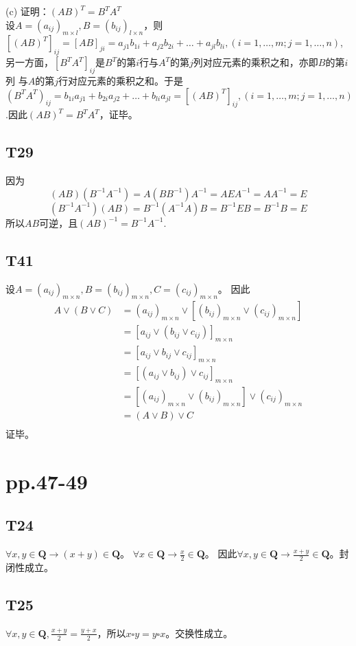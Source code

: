\documentclass{article}
\begin{document}
(c) 证明：$(AB)^T = B^TA^T$\\
设$A = (a_{ij})_{m\times l}, B = (b_{ij})_{l \times n}$，则$[(AB)^T]_{ij} = [AB]_{ji}
= a_{j1}b_{1i} + a_{j2}b_{2i} + \dots + a_{jl}b_{li},(i = 1, \dots , m; j = 1, \dots , n)$,
另一方面，$[B^TA^T]_{ij}$是$B^T$的第$i$行与$A^T$的第$j$列对应元素的乘积之和，亦即$B$的第$i$列
与$A$的第$j$行对应元素的乘积之和。于是$(B^TA^T)_{ij} = b_{1i}a_{j1} + b_{2i}a_{j2} + \dots +b_{li}a_{jl}
= [(AB)^T]_{ij}, (i = 1, \dots ,m; j = 1, \dots, n)$.因此$(AB)^T = B^TA^T$，证毕。

\subsection{T29}
因为
\[
(AB)(B^{-1}A^{-1}) = A(BB^{-1})A^{-1} = AEA^{-1} = AA^{-1} = E
\]
\[
(B^{-1}A^{-1})(AB) = B^{-1}(A^{-1}A)B = B^{-1}EB = B^{-1}B = E
\]
所以$AB$可逆，且$(AB)^{-1} = B^{-1}A^{-1}$.
\subsection{T41}
设$A = (a_{ij})_{m \times n}, B = (b_{ij})_{m \times n}, C = (c_{ij})_{m \times n}$。
因此
\begin{align*}
    A \lor (B \lor C) &= (a_{ij})_{m \times n} \lor [(b_{ij})_{m \times n} \lor (c_{ij})_{m \times n}]\\
    &= [a_{ij} \lor (b_{ij} \lor c_{ij})]_{m \times n}\\
    &= [a_{ij} \lor b_{ij} \lor c_{ij}]_{m \times n}\\
    &= [(a_{ij} \lor b_{ij}) \lor c_{ij}]_{m \times n}\\
    &= [(a_{ij})_{m \times n} \lor (b_{ij})_{m \times n}] \lor (c_{ij})_{m \times n}\\
    &= (A \lor B) \lor C\\ 
\end{align*}证毕。

\section{pp.47-49}
\subsection{T24}
$\forall x, y \in \mathbf{Q} \rightarrow (x + y) \in \mathbf{Q}$。
$\forall x \in \mathbf{Q} \rightarrow \frac{x}{2} \in \mathbf{Q}$。
因此$\forall x, y \in \mathbf{Q} \rightarrow \frac{x + y}{2} \in \mathbf{Q}$。封闭性成立。
\subsection{T25}
$\forall x, y \in \mathbf{Q}, \frac{x + y}{2} = \frac{y + x}{2}$，所以$x \square y = y \square x$。交换性成立。
\end{document}
